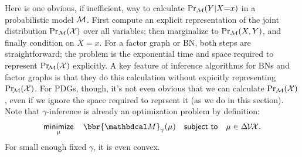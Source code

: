 \documentclass[twoside]{article}
\newcommand\discard[1]{}
\begin{document}
Here is one obvious, if inefficient, way to calculate $\Pr_{\cal M}(Y|X{=}x)$ in a
probabilistic model $\cal M$. First compute an explicit representation of the joint distribution $\Pr_{\cal M}(\mathcal X)$ over all variables; then marginalize to $\Pr_{\cal M}(X,Y)$, and finally condition on $X\!=\!x$.
%
For a factor graph
or BN, both steps are straightforward;
the problem is the exponential time and space required to represent $\Pr_{\!\cal M}(\mathcal X)$ explicitly.
A key feature of inference algorithms for BNs and factor graphs is that they do this calculation without expicitly representing $\Pr_{\!\cal M}(\mathcal X)$.
%
For PDGs, though, it's not even obvious that
we can calculate $\Pr_{\cal M}(\mathcal X)$, even if we ignore the space required to reprsent it (as we do in this section).
Note that $\gamma$-inference is already an optimization problem by definition:
\[
    \mathop{\text{\sf minimize}}\limits_\mu\quad
        \bbr{\dg M}_\gamma(\mu)
    \quad \text{\sf subject to}\quad \mu \in \Delta\mskip-2mu\V\mskip-2mu\X.
\]
For small enough fixed $\gamma$,
it is even convex.%
\end{document}
